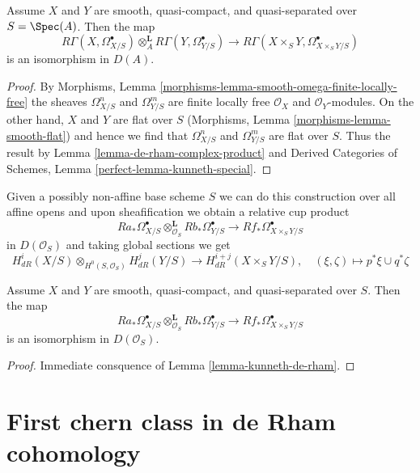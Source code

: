 \begin{lemma}
\label{lemma-kunneth-de-rham}
Assume $X$ and $Y$ are smooth, quasi-compact, and quasi-separated over
$S = \Spec(A)$. Then the map
$$
R\Gamma(X, \Omega^\bullet_{X/S})
\otimes_A^\mathbf{L}
R\Gamma(Y, \Omega^\bullet_{Y/S})
\longrightarrow
R\Gamma(X \times_S Y, \Omega^\bullet_{X \times_S Y/S})
$$
is an isomorphism in $D(A)$.
\end{lemma}

\begin{proof}
By Morphisms, Lemma \ref{morphisms-lemma-smooth-omega-finite-locally-free}
the sheaves $\Omega^n_{X/S}$ and $\Omega^m_{Y/S}$ are finite locally free
$\mathcal{O}_X$ and $\mathcal{O}_Y$-modules. On the other hand, $X$ and $Y$
are flat over $S$ (Morphisms, Lemma \ref{morphisms-lemma-smooth-flat})
and hence we find that $\Omega^n_{X/S}$ and $\Omega^m_{Y/S}$ are flat over $S$.
Thus the result by
Lemma \ref{lemma-de-rham-complex-product} and
Derived Categories of Schemes, Lemma \ref{perfect-lemma-kunneth-special}.
\end{proof}

\noindent
Given a possibly non-affine base scheme $S$ we can do this
construction over all affine opens and upon sheafification
we obtain a relative cup product
$$
Ra_*\Omega^\bullet_{X/S}
\otimes_{\mathcal{O}_S}^\mathbf{L}
Rb_*\Omega^\bullet_{Y/S}
\longrightarrow
Rf_*\Omega^\bullet_{X \times_S Y/S}
$$
in $D(\mathcal{O}_S)$ and taking global sections we get
$$
H^i_{dR}(X/S) \otimes_{H^0(S, \mathcal{O}_S)} H^j_{dR}(Y/S)
\longrightarrow
H^{i + j}_{dR}(X \times_S Y/S),\quad
(\xi, \zeta) \longmapsto p^*\xi \cup q^*\zeta
$$

\begin{lemma}
\label{lemma-kunneth-de-rham-relative}
Assume $X$ and $Y$ are smooth, quasi-compact, and quasi-separated over
$S$. Then the map
$$
Ra_*\Omega^\bullet_{X/S}
\otimes_{\mathcal{O}_S}^\mathbf{L}
Rb_*\Omega^\bullet_{Y/S}
\longrightarrow
Rf_*\Omega^\bullet_{X \times_S Y/S}
$$
is an isomorphism in $D(\mathcal{O}_S)$.
\end{lemma}

\begin{proof}
Immediate consquence of Lemma \ref{lemma-kunneth-de-rham}.
\end{proof}







\section{First chern class in de Rham cohomology}
\label{section-first-chern-class}

